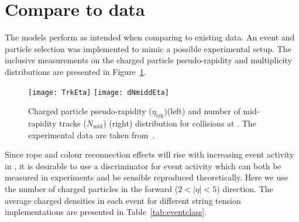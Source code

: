 \documentclass[ALICE,manyauthors]{StrinJet}
\begin{document}


\section{Compare to data}
\label{sec:com2da}
The models perform as intended when comparing to existing data. An event and particle selection was implemented to mimic a possible experimental setup.
The inclusive measurements on the charged particle pseudo-rapidity and multiplicity distributions are presented in Figure~\ref{fig:trkinfo}.
\begin{figure}[htp]
	\begin{center}
		\texttt{[image: TrkEta]}
		\texttt{[image: dNmiddEta]}
	\end{center}
	\caption{Charged particle pseudo-rapidity ($\eta_\mathrm{trk}$)(left) and number of mid-rapidity tracks ($N_\mathrm{mid}$) (right) distribution for \pp collisions at \seven.  The experimental data are taken from~\cite{ALICE:2010mty}.}
	\label{fig:trkinfo}
\end{figure}

Since rope and colour reconnection effects will rise with increasing event activity in \pp, it is desirable to use a discriminator for event activity which can both be measured in experiments and be sensible reproduced theoretically. Here we use the number of charged particles in the forward ($2 < |\eta| < 5$) direction.
The average charged densities in each event for different string tension implementations are presented in Table~\ref{tab:eventclass}.
\end{document}
